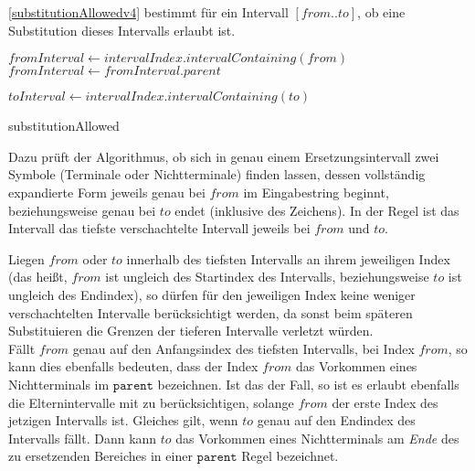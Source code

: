 \autoref{substitutionAllowedv4} bestimmt für ein Intervall $[from..to]$, ob eine Substitution dieses Intervalls erlaubt ist. 
\begin{algorithm}[t]
    $fromInterval \leftarrow intervalIndex.intervalContaining(from)$\;
     {
        $fromInterval \leftarrow fromInterval.parent$\;
    }

     {
        \KwRet{\KwFalse}
    }

    $toInterval \leftarrow intervalIndex.intervalContaining(to)$\;
    
    \caption{substitutionAllowed}
    \label{substitutionAllowedv4}
\end{algorithm}
Dazu prüft der Algorithmus, ob sich in genau einem Ersetzungsintervall zwei Symbole (Terminale oder Nichtterminale) finden lassen, dessen vollständig expandierte Form jeweils genau bei $from$ im Eingabestring beginnt, beziehungsweise genau bei $to$ endet (inklusive des Zeichens).
In der Regel ist das Intervall das tiefste verschachtelte Intervall jeweils bei $from$ und $to$. 

Liegen $from$ oder $to$ innerhalb des tiefsten Intervalls an ihrem jeweiligen Index (das heißt, $from$ ist ungleich des Startindex des Intervalls, beziehungsweise $to$ ist ungleich des Endindex), so dürfen für den jeweiligen Index keine weniger verschachtelten Intervalle berücksichtigt werden, da sonst beim späteren Substituieren die Grenzen der tieferen Intervalle verletzt würden.\\ 
Fällt $from$ genau auf den Anfangsindex des tiefsten Intervalls, bei Index $from$, so kann dies ebenfalls bedeuten, dass der Index $from$ das Vorkommen eines Nichtterminals im $\texttt{parent}$ bezeichnen. Ist das der Fall, so ist es erlaubt ebenfalls die Elternintervalle mit zu berücksichtigen, solange $from$ der erste Index des jetzigen Intervalls ist. Gleiches gilt, wenn $to$ genau auf den Endindex des Intervalls fällt. Dann kann $to$ das Vorkommen eines Nichtterminals am \emph{Ende} des zu ersetzenden Bereiches in einer $\texttt{parent}$ Regel bezeichnet.

